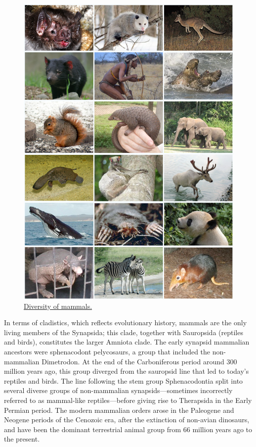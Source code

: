 \begin{figure}

{\centering \includegraphics[width=0.7\linewidth]{./figures/animals/Mammal_Diversity_2011} 

}

\caption{\href{https://en.wikipedia.org/wiki/File:Mammal_Diversity_2011.png}{Diversity of mammals.}}\label{fig:mammaldiversity}
\end{figure}

In terms of cladistics, which reflects evolutionary history, mammals are the only living members of the Synapsida; this clade, together with Sauropsida (reptiles and birds), constitutes the larger Amniota clade. The early synapsid mammalian ancestors were sphenacodont pelycosaurs, a group that included the non-mammalian Dimetrodon. At the end of the Carboniferous period around 300 million years ago, this group diverged from the sauropsid line that led to today's reptiles and birds. The line following the stem group Sphenacodontia split into several diverse groups of non-mammalian synapsids---sometimes incorrectly referred to as mammal-like reptiles---before giving rise to Therapsida in the Early Permian period. The modern mammalian orders arose in the Paleogene and Neogene periods of the Cenozoic era, after the extinction of non-avian dinosaurs, and have been the dominant terrestrial animal group from 66 million years ago to the present.

